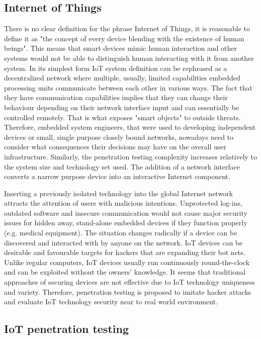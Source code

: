 \subsection{Internet of Things}
There is no clear definition for the phrase Internet of Things, it is reasonable to define it as "the concept of every device blending with the existence of human beings"\cite{DBLP:journals/corr/MendezPY17}. This means that smart devices mimic human interaction and other systems would not be able to distinguish human interacting with it from another system. In its simplest form IoT system definition can be rephrased as a decentralized network where multiple, usually, limited capabilities embedded processing units communicate between each other in various ways\cite{itu-t2060}. The fact that they have communication capabilities implies that they can change their behaviour depending on their network interface input and can essentially be controlled remotely. That is what exposes "smart objects" to outside threats\cite{riahi:hal-00868362}. Therefore, embedded system engineers, that were used to developing independent devices or small, single purpose closely bound networks, nowadays need to consider what consequences their decisions may have on the overall user infrastructure. Similarly, the penetration testing complexity increases relatively to the system size and technology set used. The addition of a network interface converts a narrow purpose device into an interactive Internet component.

Inserting a previously isolated technology into the global Internet network attracts the attention of users with malicious intentions. Unprotected log-ins, outdated software and insecure communication would not cause major security issues for hidden away, stand-alone embedded devices if they function properly (e.g. medical equipment).  The situation changes radically if a device can be discovered and interacted with by anyone on the network. IoT devices can be desirable and favourable targets for hackers that are expanding their bot nets. Unlike regular computers, IoT devices usually run continuously round-the-clock and can be exploited without the owners’ knowledge\cite{191952}. It seems that traditional approaches of securing devices are not effective\cite{DBLP:journals/corr/abs-1803-05022} due to IoT technology uniqueness and variety. Therefore, penetration testing is proposed to imitate hacker attacks and evaluate IoT technology security near to real world environment.

\subsection{IoT penetration testing}

